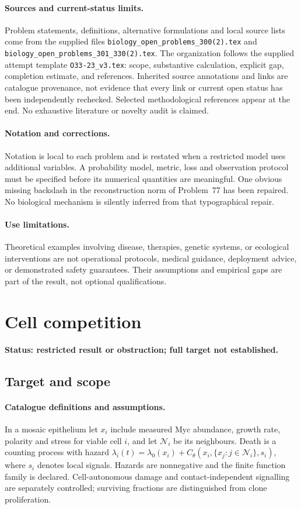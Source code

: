 \documentclass[11pt]{article}
\begin{document}
\paragraph{Sources and current-status limits.}
Problem statements, definitions, alternative formulations and local source lists
come from the supplied files
\texttt{biology\_open\_problems\_300(2).tex} and
\texttt{biology\_open\_problems\_301\_330(2).tex}.
The organization follows the supplied attempt template
\texttt{O33-23\_v3.tex}: scope, substantive calculation, explicit gap,
completion estimate, and references. Inherited source annotations and links are
catalogue provenance, not evidence that every link or current open status has
been independently rechecked. Selected methodological references appear at the
end. No exhaustive literature or novelty audit is claimed.

\paragraph{Notation and corrections.}
Notation is local to each problem and is restated when a restricted model uses
additional variables. A probability model, metric, loss and observation protocol
must be specified before its numerical quantities are meaningful. One obvious
missing backslash in the reconstruction norm of Problem~77 has been repaired.
No biological mechanism is silently inferred from that typographical repair.

\paragraph{Use limitations.}
Theoretical examples involving disease, therapies, genetic systems, or ecological
interventions are not operational protocols, medical guidance, deployment advice,
or demonstrated safety guarantees. Their assumptions and empirical gaps are part
of the result, not optional qualifications.


\section*{Cell competition}
\label{prob:135}
\noindent\textbf{Status: restricted result or obstruction; full target not established.}
\subsection{Target and scope}
\paragraph{Catalogue definitions and assumptions.}
In a mosaic epithelium let $x_i$ include measured Myc abundance, growth rate, polarity and stress for viable cell $i$, and let $\mathcal N_i$ be its neighbours. Death is a counting process with hazard $\lambda_i(t)=\lambda_0(x_i)+C_\theta(x_i,\{x_j:j\in\mathcal N_i\},s_i)$, where $s_i$ denotes local signals. Hazards are nonnegative and the finite function family is declared. Cell-autonomous damage and contact-independent signalling are separately controlled; surviving fractions are distinguished from clone proliferation.
\end{document}
